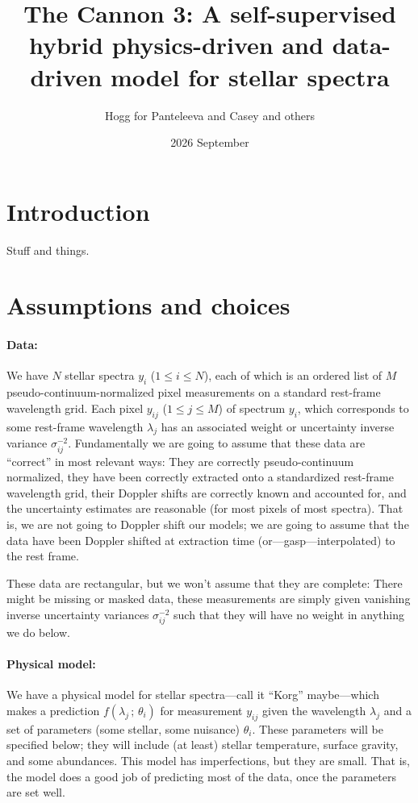 \documentclass{article}
\title{\bfseries The Cannon 3: A self-supervised hybrid physics-driven and data-driven model for stellar spectra}
\author{Hogg for Panteleeva and Casey and others}
\date{2026 September}
\newcommand{\semicolon}{\,;\,}
\begin{document}
\maketitle

\section{Introduction}
Stuff and things.

\section{Assumptions and choices}
\paragraph{Data:}
We have $N$ stellar spectra $y_i$ ($1\leq i\leq N$), each of which is an ordered list of $M$ pseudo-continuum-normalized pixel measurements on a standard rest-frame wavelength grid.
Each pixel $y_{ij}$ ($1\leq j\leq M$) of spectrum $y_i$, which corresponds to some rest-frame wavelength $\lambda_j$ has an associated weight or uncertainty inverse variance $\sigma^{-2}_{ij}$.
Fundamentally we are going to assume that these data are ``correct'' in most relevant ways:
They are correctly pseudo-continuum normalized, they have been correctly extracted onto a standardized rest-frame wavelength grid, their Doppler shifts are correctly known and accounted for, and the uncertainty estimates are reasonable (for most pixels of most spectra).
That is, we are not going to Doppler shift our models; we are going to assume that the data have been Doppler shifted at extraction time (or---gasp---interpolated) to the rest frame.

These data are rectangular, but we won't assume that they are complete:
There might be missing or masked data, these measurements are simply given vanishing inverse uncertainty variances $\sigma^{-2}_{ij}$ such that they will have no weight in anything we do below.

\paragraph{Physical model:}
We have a physical model for stellar spectra---call it ``Korg'' maybe---which makes a prediction $f(\lambda_j\semicolon\theta_i)$ for measurement $y_{ij}$ given the wavelength $\lambda_j$ and a set of parameters (some stellar, some nuisance) $\theta_i$.
These parameters will be specified below; they will include (at least) stellar temperature, surface gravity, and some abundances.
This model has imperfections, but they are small.
That is, the model does a good job of predicting most of the data, once the parameters are set well.
\end{document}
